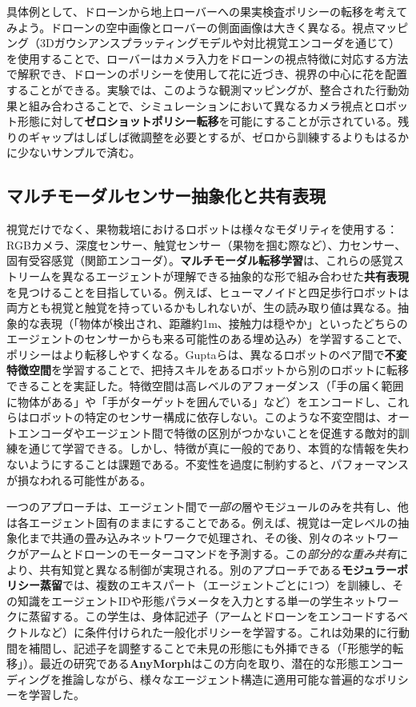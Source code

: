 \documentclass[a4paper,fleqn,10pt,twocolumn]{template_v1.0}
\begin{document}
具体例として、ドローンから地上ローバーへの果実検査ポリシーの転移を考えてみよう。ドローンの空中画像とローバーの側面画像は大きく異なる。視点マッピング（3Dガウシアンスプラッティングモデルや対比視覚エンコーダを通じて）を使用することで、ローバーはカメラ入力をドローンの視点特徴に対応する方法で解釈でき、ドローンのポリシーを使用して花に近づき、視界の中心に花を配置することができる。実験では、このような観測マッピングが、整合された行動効果と組み合わさることで、シミュレーションにおいて異なるカメラ視点とロボット形態に対して\textbf{ゼロショットポリシー転移}を可能にすることが示されている\cite{Zhu2024}。残りのギャップはしばしば微調整を必要とするが、ゼロから訓練するよりもはるかに少ないサンプルで済む。

\subsection{マルチモーダルセンサー抽象化と共有表現}
視覚だけでなく、果物栽培におけるロボットは様々なモダリティを使用する：RGBカメラ、深度センサー、触覚センサー（果物を掴む際など）、力センサー、固有受容感覚（関節エンコーダ）。\textbf{マルチモーダル転移学習}は、これらの感覚ストリームを異なるエージェントが理解できる抽象的な形で組み合わせた\textbf{共有表現}を見つけることを目指している。例えば、ヒューマノイドと四足歩行ロボットは両方とも視覚と触覚を持っているかもしれないが、生の読み取り値は異なる。抽象的な表現（「物体が検出され、距離約1m、接触力は穏やか」といったどちらのエージェントのセンサーからも来る可能性のある埋め込み）を学習することで、ポリシーはより転移しやすくなる。Guptaらは、異なるロボットのペア間で\textbf{不変特徴空間}を学習することで、把持スキルをあるロボットから別のロボットに転移できることを実証した\cite{Gupta2017}。特徴空間は高レベルのアフォーダンス（「手の届く範囲に物体がある」や「手がターゲットを囲んでいる」など）をエンコードし、これらはロボットの特定のセンサー構成に依存しない。このような不変空間は、オートエンコーダやエージェント間で特徴の区別がつかないことを促進する敵対的訓練を通じて学習できる\cite{Zhu2024}。しかし、特徴が真に一般的であり、本質的な情報を失わないようにすることは課題である。不変性を過度に制約すると、パフォーマンスが損なわれる可能性がある\cite{Zhu2024}。

一つのアプローチは、エージェント間で\textit{一部の}層やモジュールのみを共有し、他は各エージェント固有のままにすることである。例えば、視覚は一定レベルの抽象化まで共通の畳み込みネットワークで処理され、その後、別々のネットワークがアームとドローンのモーターコマンドを予測する。この\textit{部分的な重み共有}により、共有知覚と異なる制御が実現される。別のアプローチである\textbf{モジュラーポリシー蒸留}では、複数のエキスパート（エージェントごとに1つ）を訓練し、その知識をエージェントIDや形態パラメータを入力とする単一の学生ネットワークに蒸留する。この学生は、身体記述子（アームとドローンをエンコードするベクトルなど）に条件付けられた一般化ポリシーを学習する\cite{Zhu2024}。これは効果的に行動間を補間し、記述子を調整することで未見の形態にも外挿できる（「形態学的転移」\cite{Zhu2024}）。最近の研究である\textbf{AnyMorph}はこの方向を取り、潜在的な形態エンコーディングを推論しながら、様々なエージェント構造に適用可能な普遍的なポリシーを学習した\cite{Trabucco2022}。
\end{document}
